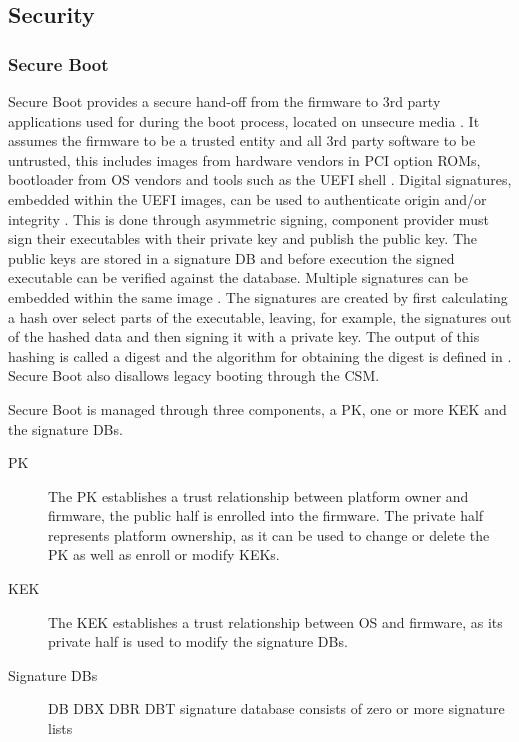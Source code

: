 
\subsection{Security}

\subsubsection{Secure Boot}

Secure Boot provides a secure hand-off from the firmware to 3rd party applications used for during the boot process, located on unsecure media \cite{tianocore-understanding-uefi-secure-boot-chain}\cite[32.2 and 32.5.1]{uefi-spec}.
It assumes the firmware to be a trusted entity and all 3rd party software to be untrusted, this includes images from hardware vendors in \ac{PCI} option \acp{ROM}, bootloader from \ac{OS} vendors and tools such as the \ac{UEFI} shell \cite{tianocore-understanding-uefi-secure-boot-chain}.
Digital signatures, embedded within the \ac{UEFI} images, can be used to authenticate origin and/or integrity \cite[32.2]{uefi-spec}.
This is done through asymmetric signing, component provider must sign their executables with their private key and publish the public key.
The public keys are stored in a signature \ac{DB} and before execution the signed executable can be verified against the database.
Multiple signatures can be embedded within the same image \cite[32.2.2]{uefi-spec}.
The signatures are created by first calculating a hash over select parts of the executable, leaving, for example, the signatures out of the hashed data and then signing it with a private key.
The output of this hashing is called a digest and the algorithm for obtaining the digest is defined in \cite{microsoft-pe-signature-format}.
Secure Boot also disallows legacy booting through the \ac{CSM}.

Secure Boot is managed through three components, a \ac{PK}, one or more \ac{KEK} and the signature \acp{DB}.

\begin{description}
    \item[\ac{PK}]
        The \ac{PK} establishes a trust relationship between platform owner and firmware, the public half is enrolled into the firmware.
        The private half represents platform ownership, as it can be used to change or delete the \ac{PK} as well as enroll or modify \acp{KEK}.
    \item[\ac{KEK}]
        The \ac{KEK} establishes a trust relationship between \ac{OS} and firmware, as its private half is used to modify the signature \acp{DB}.
    \item[Signature \acfp{DB}]
        \ac{DB} \ac{DBX} \ac{DBR} \ac{DBT}
        signature database consists of zero or more signature lists
\end{description}

